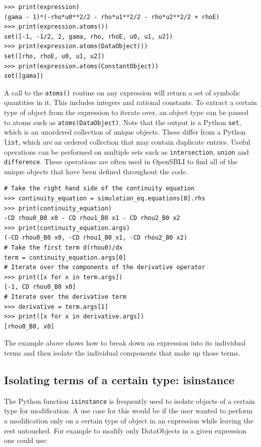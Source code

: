 \documentclass[11pt]{article}
\begin{document}
\begin{lstlisting}
>>> print(expression)
(gama - 1)*(-rho*u0**2/2 - rho*u1**2/2 - rho*u2**2/2 + rhoE)
>>> print(expression.atoms())
set([-1, -1/2, 2, gama, rho, rhoE, u0, u1, u2])
>>> print(expression.atoms(DataObject)))
set([rho, rhoE, u0, u1, u2])
>>> print(expression.atoms(ConstantObject))
set([gama])
\end{lstlisting}
A call to the \verb|atoms()| routine on any expression will return a set of symbolic quantities in it. This includes integers and rational constants. To extract a certain type of object from the expression to iterate over, an object type can be passed to atoms such as \verb|atoms(DataObject)|. Note that the output is a Python \verb|set|, which is an unordered collection of unique objects. These differ from a Python \verb|list|, which are an ordered collection that may contain duplicate entries. Useful operations can be performed on multiple sets such as \verb|intersection|, \verb|union| and \verb|difference|. These operations are often used in OpenSBLI to find all of the unique objects that have been defined throughout the code.


\begin{lstlisting}
# Take the right hand side of the continuity equation
>>> continuity_equation = simulation_eq.equations[0].rhs
>>> print(continuity_equation)
-CD rhou0_B0 x0 - CD rhou1_B0 x1 - CD rhou2_B0 x2
>>> print(continuity_equation.args)
(-CD rhou0_B0 x0, -CD rhou1_B0 x1, -CD rhou2_B0 x2)
# Take the first term d(rhou0)/dx
term = continuity_equation.args[0]
# Iterate over the components of the derivative operator
>>> print([x for x in term.args])
[-1, CD rhou0_B0 x0]
# Iterate over the derivative term
>>> derivative = term.args[1]
>>> print([x for x in derivative.args])
[rhou0_B0, x0]
\end{lstlisting}
The example above shows how to break down an expression into its individual terms and then isolate the individual components that make up those terms.


\subsection{Isolating terms of a certain type: isinstance}
The Python function \verb|isinstance| is frequently used to isolate objects of a certain type for modification. A use case for this would be if the user wanted to perform a modification only on a certain type of object in an expression while leaving the rest untouched. For example to modify only DataObjects in a given expression one could use:
\end{document}
